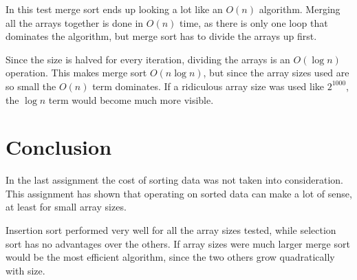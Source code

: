 \documentclass[a4paper,11pt]{article}
\begin{document}
In this test merge sort ends up looking a lot like an $O(n)$ algorithm.
Merging all the arrays together is done in $O(n)$ time, as there is only one loop that dominates the algorithm, but merge sort has to divide the arrays up first.

Since the size is halved for every iteration, dividing the arrays is an $O(\log n)$ operation. This makes merge sort $O(n \log n)$, but since the array sizes used are so small the $O(n)$ term dominates.
If a ridiculous array size was used like $2^1000$, the $\log n$ term would become much more visible.

\section*{Conclusion}

In the last assignment the cost of sorting data was not taken into consideration. This assignment has shown that operating on sorted data can make a lot of sense, at least for small array sizes.

Insertion sort performed very well for all the array sizes tested, while selection sort has no advantages over the others. If array sizes were much larger merge sort would be the most efficient algorithm, since the two others grow quadratically with size.
\end{document}
